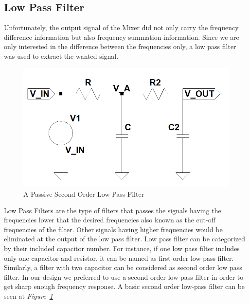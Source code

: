 \documentclass[paper]{IEEEtran}
\begin{document}

		
				
\subsection{Low Pass Filter}


	Unfortunately, the output signal of the Mixer did not only carry the frequency difference information but also frequency summation information. Since we are only interested in the difference between the frequencies only, a low pass filter was used to extract the wanted signal.


\begin{figure}[h!]
	\setlength{\unitlength}{\textwidth}
	\center 
	\includegraphics[width=0.5\unitlength]{lpf_v4.png}
	\caption{\label{fig:pslpf}A Passive Second Order Low-Pass Filter }
\end{figure} 	
	
	Low Pass Filters are the type of filters that passes the signals having the frequencies lower that the desired frequencies also known as the cut-off frequencies of the filter. Other signals having higher frequencies would be eliminated at the output of the low pass filter. Low pass filter can be categorized by their included capacitor number. For instance, if one low pass filter includes only one capacitor and resistor, it can be named as first order low pass filter. Similarly, a filter with two capacitor can be considered as second order low pass filter. In our design we preferred to use a second order low pass filter in order to get sharp enough frequency response. A basic second order low-pass filter can be seen at \textit{Figure~\ref{fig:pslpf}} \\ 
	
\end{document}
